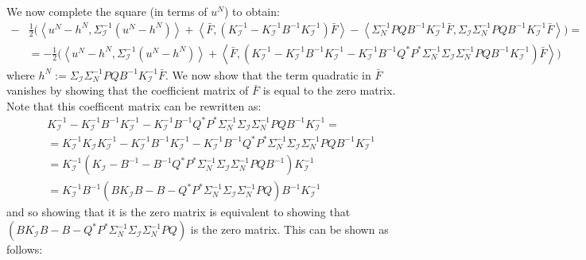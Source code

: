 We now complete the square (in terms of $u^{N}$) to obtain:
\begin{align}
    -&\frac{1}{2}\Big(\left\langle u^{N}-h^{N},\Sigma_{\mathcal{I}}^{-1}(u^{N}-h^{N}) \right\rangle + \left\langle \bar{F}, (K_{\mathcal{I}}^{-1}-K_{\mathcal{I}}^{-1}B^{-1}K_{\mathcal{I}}^{-1})\bar{F} \right\rangle - \left\langle \Sigma_{N}^{-1}PQB^{-1}K_{\mathcal{I}}^{-1}\bar{F},\Sigma_{\mathcal{I}}\Sigma_{N}^{-1}PQB^{-1}K_{\mathcal{I}}^{-1}\bar{F} \right\rangle \Big) = \nonumber \\
    &=-\frac{1}{2}\Big(\left\langle u^{N}-h^{N},\Sigma_{\mathcal{I}}^{-1}(u^{N}-h^{N}) \right\rangle + \left\langle \bar{F}, (K_{\mathcal{I}}^{-1}-K_{\mathcal{I}}^{-1}B^{-1}K_{\mathcal{I}}^{-1}-K_{\mathcal{I}}^{-1}B^{-1}Q^{*}P^{*}\Sigma_{N}^{-1}\Sigma_{\mathcal{I}}\Sigma_{N}^{-1}PQB^{-1}K_{\mathcal{I}}^{-1})\bar{F} \right\rangle\Big)
\end{align}
where $h^{N}:=\Sigma_{\mathcal{I}}\Sigma_{N}^{-1}PQB^{-1}K_{\mathcal{I}}^{-1}\bar{F}$. We now show that the term quadratic in $\bar{F}$ vanishes by showing that the coefficient matrix of $\bar{F}$ is equal to the zero matrix. Note that this coefficent matrix can be rewritten as:
\begin{align*}
    &K_{\mathcal{I}}^{-1}-K_{\mathcal{I}}^{-1}B^{-1}K_{\mathcal{I}}^{-1}-K_{\mathcal{I}}^{-1}B^{-1}Q^{*}P^{*}\Sigma_{N}^{-1}\Sigma_{\mathcal{I}}\Sigma_{N}^{-1}PQB^{-1}K_{\mathcal{I}}^{-1} = \\
    &=K_{\mathcal{I}}^{-1}K_{\mathcal{I}}K_{\mathcal{I}}^{-1}-K_{\mathcal{I}}^{-1}B^{-1}K_{\mathcal{I}}^{-1}-K_{\mathcal{I}}^{-1}B^{-1}Q^{*}P^{*}\Sigma_{N}^{-1}\Sigma_{\mathcal{I}}\Sigma_{N}^{-1}PQB^{-1}K_{\mathcal{I}}^{-1} \\
    &= K_{\mathcal{I}}^{-1}(K_{\mathcal{I}}-B^{-1}-B^{-1}Q^{*}P^{*}\Sigma_{N}^{-1}\Sigma_{\mathcal{I}}\Sigma_{N}^{-1}PQB^{-1})K_{\mathcal{I}}^{-1} \\
    &=K_{\mathcal{I}}^{-1}B^{-1}(BK_{\mathcal{I}}B-B-Q^{*}P^{*}\Sigma_{N}^{-1}\Sigma_{\mathcal{I}}\Sigma_{N}^{-1}PQ)B^{-1}K_{\mathcal{I}}^{-1}
\end{align*}
and so showing that it is the zero matrix is equivalent to showing that $(BK_{\mathcal{I}}B-B-Q^{*}P^{*}\Sigma_{N}^{-1}\Sigma_{\mathcal{I}}\Sigma_{N}^{-1}PQ)$ is the zero matrix. This can be shown as follows:

